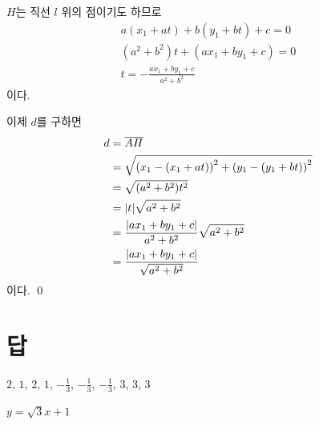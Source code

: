 \documentclass{oblivoir}
\begin{document}
\medskip
\(H\)는 직선 \(l\) 위의 점이기도 하므로
\begin{gather*}
a(x_1+at)+b(y_1+bt)+c=0\\
(a^2+b^2)t+(ax_1+by_1+c)=0\\
t=-\frac{ax_1+by_1+c}{a^2+b^2}
\end{gather*}
이다.

\medskip
이제 \(d\)를 구하면
\begin{align*}
d
&=\overline{AH}\\
&=\sqrt{\left(x_1-(x_1+at)\right)^2+\left(y_1-(y_1+bt)\right)^2}\\
&=\sqrt{(a^2+b^2)t^2}\\
&=|t|\sqrt{a^2+b^2}\\
&=\frac{|ax_1+by_1+c|}{a^2+b^2}\sqrt{a^2+b^2}\\
&=\frac{|ax_1+by_1+c|}{\sqrt{a^2+b^2}}
\end{align*}
이다.
\qed

\section*{답}
%
\(2\), \(1\), \(2\), \(1\), \(-\frac13\), \(-\frac13\), \(-\frac13\), \(3\), \(3\), \(3\)

%
\(y=\sqrt3x+1\)
\end{document}
